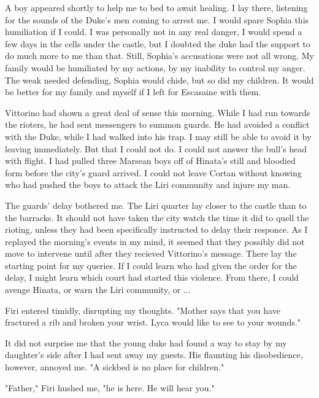 \documentclass{article}
\begin{document}
A boy appeared shortly to help me to bed to await healing. I lay there, listening for the sounds of the Duke's men coming to arrest me. I would spare Sophia this humiliation if I could. I was personally not in any real danger, I would spend a few days in the cells under the castle, but I doubted the duke had the support to do much more to me than that. Still, Sophia's accusations were not all wrong. My family would be humiliated  by my actions, by my inability to control my anger. The weak needed defending, Sophia would chide, but so did my children. It would be better for my family and myself if I left for Escasaine with them. 

Vittorino had shown a great deal of sense this morning. While I had run towards the rioters, he had sent messengers to summon guards. He had avoided a conflict with the Duke, while I had walked into his trap. I may still be able to avoid it by leaving immediately. But that I could not do. I could not answer the bull's head with flight. I had pulled three Marsean boys off of Hinata's still and bloodied form before the city's guard arrived. I could not leave Cortan without knowing who had pushed the boys to attack the Liri community and injure my man.

The guards' delay bothered me. The Liri quarter lay closer to the castle than to the barracks. It should not have taken the city watch the time it did to quell the rioting, unless they had been specifically instructed to delay their responce. As I replayed the morning's events in my mind, it seemed that they possibly did not move to intervene until after they recieved Vittorino's message. There lay the starting point for my queries. If I could learn who had given the order for the delay, I might learn which court had started this violence. From there, I could avenge Hinata, or warn the Liri community, or ...

Firi entered timidly, disrupting my thoughts. "Mother says that you have fractured a rib and broken your wrist. Lyca would like to see to your wounds."

It did not surprise me that the young duke had found a way to stay by my daughter's side after I had sent away my guests. His flaunting his disobedience, however, annoyed me. "A sickbed is no place for children."

"Father," Firi hushed me, "he is here. He will hear you."
\end{document}
